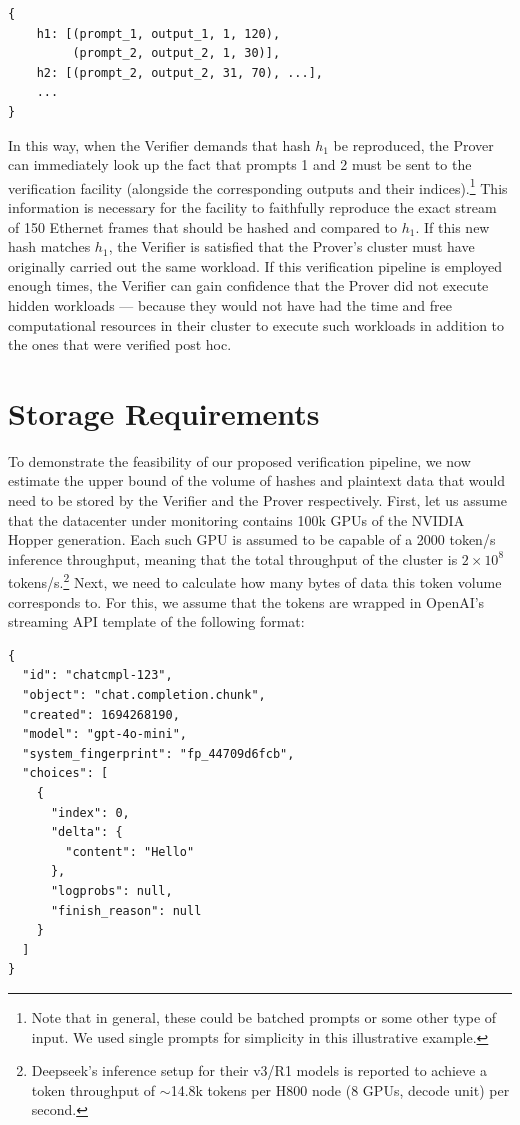 \documentclass{article}
\begin{document}
\begin{verbatim}
{
    h1: [(prompt_1, output_1, 1, 120),
         (prompt_2, output_2, 1, 30)],
    h2: [(prompt_2, output_2, 31, 70), ...],
    ...
}
\end{verbatim}

In this way, when the Verifier demands that hash $h_1$ be reproduced, the Prover can immediately look up the fact that prompts 1 and 2 must be sent to the verification facility (alongside the corresponding outputs and their indices).\footnote{Note that in general, these could be batched prompts or some other type of input. We used single prompts for simplicity in this illustrative example.} This information is necessary for the facility to faithfully reproduce the exact stream of 150 Ethernet frames that should be hashed and compared to $h_1$. If this new hash matches $h_1$, the Verifier is satisfied that the Prover's cluster must have originally carried out the same workload. If this verification pipeline is employed enough times, the Verifier can gain confidence that the Prover did not execute hidden workloads --- because they would not have had the time and free computational resources in their cluster to execute such workloads in addition to the ones that were verified post hoc.

\section{Storage Requirements}
\label{app:storage}

To demonstrate the feasibility of our proposed verification pipeline, we now estimate the upper bound of the volume of hashes and plaintext data that would need to be stored by the Verifier and the Prover respectively. First, let us assume that the datacenter under monitoring contains 100k GPUs of the NVIDIA Hopper generation. Each such GPU is assumed to be capable of a 2000 token/s inference throughput, meaning that the total throughput of the cluster is $2 \times 10^8$ tokens/s.\footnote{Deepseek's inference setup for their v3/R1 models is reported to achieve a token throughput of $\sim$14.8k tokens per H800 node (8 GPUs, decode unit) per second.} Next, we need to calculate how many bytes of data this token volume corresponds to. For this, we assume that the tokens are wrapped in OpenAI's streaming API template of the following format:

\begin{verbatim}
{
  "id": "chatcmpl-123",
  "object": "chat.completion.chunk",
  "created": 1694268190,
  "model": "gpt-4o-mini",
  "system_fingerprint": "fp_44709d6fcb",
  "choices": [
    {
      "index": 0,
      "delta": {
        "content": "Hello"
      },
      "logprobs": null,
      "finish_reason": null
    }
  ]
}
\end{verbatim}
\end{document}
